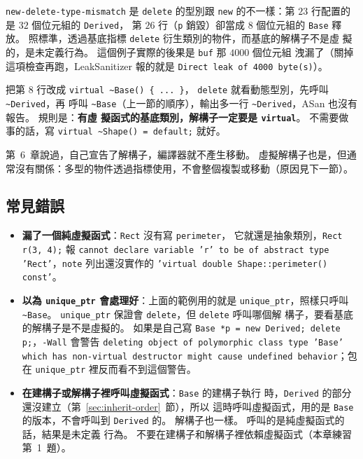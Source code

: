 \texttt{new-delete-type-mismatch} 是 \texttt{delete} 的型別跟
\texttt{new} 的不一樣：第 $23$ 行配置的是 $32$ 個位元組的 \texttt{Derived}，
第 $26$ 行（\texttt{p} 銷毀）卻當成 $8$ 個位元組的 \texttt{Base} 釋放。
照標準，透過基底指標 \texttt{delete} 衍生類別的物件，而基底的解構子不是虛
擬的，是未定義行為。 這個例子實際的後果是 \texttt{buf} 那 $4000$ 個位元組
洩漏了（關掉這項檢查再跑，LeakSanitizer 報的就是
\texttt{Direct leak of 4000 byte(s)}）。

把第 $8$ 行改成 \texttt{virtual \textasciitilde Base() \{ ... \}}，
\texttt{delete} 就看動態型別，先呼叫 \texttt{\textasciitilde Derived}，再
呼叫 \texttt{\textasciitilde Base}（上一節的順序），輸出多一行
\texttt{\textasciitilde Derived}，ASan 也沒有報告。 規則是：\textbf{有虛
擬函式的基底類別，解構子一定要是 \texttt{virtual}}。 不需要做事的話，寫
\texttt{virtual \textasciitilde Shape() = default;} 就好。

第~6~章說過，自己宣告了解構子，編譯器就不產生移動。 虛擬解構子也是，但通
常沒有關係：多型的物件透過指標使用，不會整個複製或移動（原因見下一節）。

\subsection{常見錯誤}

\begin{itemize}
\item \textbf{漏了一個純虛擬函式}：\texttt{Rect} 沒有寫 \texttt{perimeter}，
它就還是抽象類別，\texttt{Rect r(3, 4);} 報 \texttt{cannot declare variable
'r' to be of abstract type 'Rect'}，\texttt{note} 列出還沒實作的
\texttt{'virtual double Shape::perimeter() const'}。
\item \textbf{以為 \texttt{unique\_ptr} 會處理好}：上面的範例用的就是
\texttt{unique\_ptr}，照樣只呼叫 \texttt{\textasciitilde Base}。
\texttt{unique\_ptr} 保證會 \texttt{delete}，但 \texttt{delete} 呼叫哪個解
構子，要看基底的解構子是不是虛擬的。 如果是自己寫 \texttt{Base *p = new
Derived; delete p;}，\texttt{-Wall} 會警告 \texttt{deleting object of
polymorphic class type 'Base' which has non-virtual destructor might cause
undefined behavior}；包在 \texttt{unique\_ptr} 裡反而看不到這個警告。
\item \textbf{在建構子或解構子裡呼叫虛擬函式}：\texttt{Base} 的建構子執行
時，\texttt{Derived} 的部分還沒建立（第~\ref{sec:inherit-order}~節），所以
這時呼叫虛擬函式，用的是 \texttt{Base} 的版本，不會呼叫到
\texttt{Derived} 的。 解構子也一樣。 呼叫的是純虛擬函式的話，結果是未定義
行為。 不要在建構子和解構子裡依賴虛擬函式（本章練習第~1~題）。
\end{itemize}

